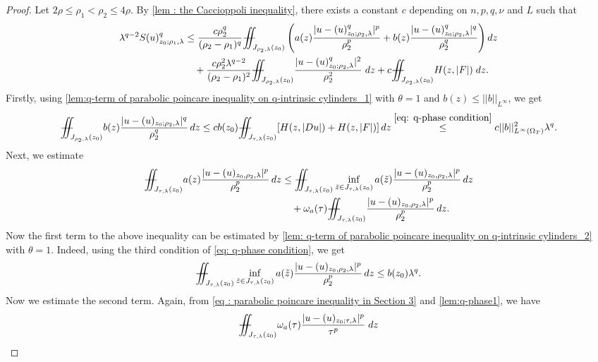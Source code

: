 \documentclass[11pt,oneside, english,reqno,twoside a4paper]{amsart}
\theoremstyle{definition}
\numberwithin{theorem}{section}
\numberwithin{equation}{section}
\newcommand{\iintss}{{\int\hspace{-0.28cm}\int}}
\newcommand{ \miints }{{\iintss\hspace{-0.56cm} -\hspace{-0.15cm}-}}
\newcommand{\miint}[1]{{\miints_{\hspace{-0.13cm}#1}}}
\begin{document}
\begin{proof}
Let $2\rho \leq \rho_1<\rho_2 \leq 4\rho$. By \cref{lem : the Caccioppoli inequality}, there exists a constant $c$ depending on $n,p,q,\nu$ and $L$ such that 
\begin{align}
\lambda^{q-2}S(u)^q_{z_0;\rho_1,\lambda}&\leq \frac{c\rho_2^q}{(\rho_2-\rho_1)^q}\miint{J_{\rho_2,\lambda}(z_0)}\left( a(z)\frac{|u-(u)^q_{z_0;\rho_2,\lambda}|^p}{\rho^p_2}+b(z)\frac{|u-(u)^q_{z_0;\rho_2,\lambda}|^q}{\rho^q_2} \right) dz \nonumber\\
&\quad + \frac{c\rho_2^2 \lambda^{q-2}}{(\rho_2-\rho_1)^2}\miint{J_{\rho_2,\lambda}(z_0)}\frac{|u-(u)^q_{z_0;\rho_2,\lambda}|^2}{\rho_2^2}\; dz +c\miint{J_{\rho_2,\lambda}(z_0)} H(z,|F|)\; dz.\label{eq : second equation in lemma 5.1}
\end{align}
Firstly, using \cref{lem:q-term of parabolic poincare inequality on q-intrinsic cylinders_1} with $\theta=1$ and $b(z)\leq ||b||_{L^{\infty}}$, we get
\begin{align*}
\miint{J_{\rho_2,\lambda}(z_0)}b(z)\frac{|u-(u)_{z_0;\rho_2,\lambda}|^q}{\rho^q_2} \, dz \leq c b(z_0) \miint{J_{\tau, \lambda}(z_0)} [H(z,|Du|)+H(z, |F|)]\,dz
\overset{\eqref{eq: q-phase condition}}{\leq} c||b||^2_{L^{\infty}(\Omega_T)}\lambda^q.   
\end{align*}
Next, we estimate
\begin{align*} 
\miint{J_{\tau, \lambda}(z_0)}a(z)\frac{|u-(u)_{z_0, \rho_2, \lambda}|^p}{\rho^p_2}\,dz&\leq \miint{J_{\tau, \lambda}(z_0)}\inf_{\tilde{z}\in J_{\tau, \lambda}(z_0)}a(\tilde{z})\frac{|u-(u)_{z_0, \rho_2, \lambda}|^p}{\rho^p_2}\,dz\\
&\quad + \omega_{a}(\tau)\miint{J_{\tau, \lambda}(z_0)}\frac{|u-(u)_{z_0, \rho_2, \lambda}|^p}{\rho^p_2}\,dz.
\end{align*}
Now the first term to the above inequality can be estimated by \cref{lem: q-term of parabolic poincare inequality on q-intrinsic cylinders_2} with $\theta =1.$ Indeed, using the third condition of \eqref{eq: q-phase condition}, we get
\begin{align*}
 \miint{J_{\tau, \lambda}(z_0)}\inf_{\tilde{z}\in J_{\tau, \lambda}(z_0)}a(\tilde{z})\frac{|u-(u)_{z_0, \rho_2, \lambda}|^p}{\rho^p_2}\,dz \leq b(z_0)\lambda^q.  
\end{align*}
Now we estimate the second term. Again, from \cref{eq : parabolic poincare inequality in Section 3} and \cref{lem:q-phase1}, we have
\begin{align}\label{EQQQ3.9}
        &\miint{J_{\tau,\lambda}(z_0)}\omega_a(\tau)\frac{|u-(u)_{z_0;\tau,\lambda}|^{p}}{\tau^{p}}\; dz\\

\end{align}
\end{proof}
\end{document}
